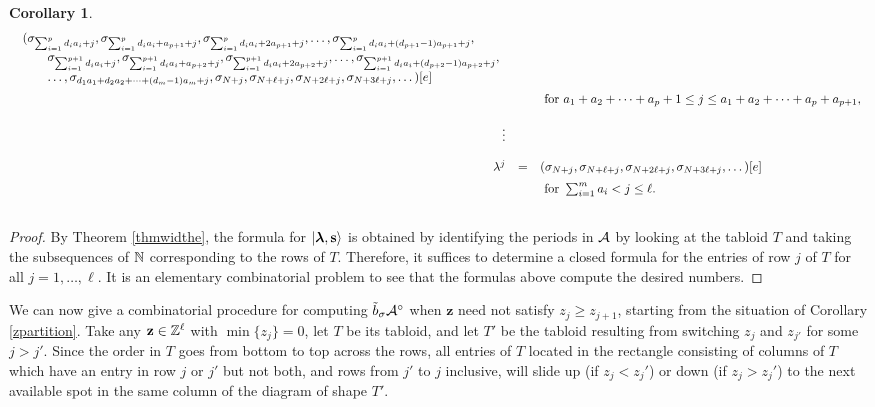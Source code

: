 \documentclass[12pt]{amsart}
\numberwithin{equation}{section}
\theoremstyle{definition}
\newtheorem{corollary}[equation]{Corollary}
\newcommand{\mbz}{\mathbf{z}}
\begin{document}
\begin{corollary}
$$\begin{array}{rcll}
\begin{array}[t]{l}
(\sigma_{\sum_{i=1}^p d_ia_i+j},\sigma_{\sum_{i=1}^p d_ia_i+a_{p+1}+j},\sigma_{\sum_{i=1}^p d_ia_i+2a_{p+1}+j},\dots,\sigma_{\sum_{i=1}^p d_ia_i+(d_{p+1}-1)a_{p+1}+j}, \\
\quad\quad \sigma_{\sum_{i=1}^{p+1} d_ia_i+j},\sigma_{\sum_{i=1}^{p+1} d_ia_i+a_{p+2}+j},\sigma_{\sum_{i=1}^{p+1} d_ia_i+2a_{p+2}+j},\dots,\sigma_{\sum_{i=1}^{p+1} d_ia_i+(d_{p+2}-1)a_{p+2}+j},\\
\quad\quad\dots,\sigma_{d_1a_1+d_2a_2+\dots+(d_m-1)a_m+j},\sigma_{N+j},\sigma_{N+\ell+j},\sigma_{N+2\ell+j},\sigma_{N+3\ell+j},\dots)[e]
\end{array}\vspace{2mm}
\\
&&\text{ for } a_1+a_2+\dots+a_p+1\leq j \leq a_1+a_2+\dots+a_p+a_{p+1},
\\ \\
\vdots
\\ \\
\la^j & 
= & 
(\sigma_{N+j},\sigma_{N+\ell+j},\sigma_{N+2\ell+j},\sigma_{N+3\ell+j},\dots)[e]
\vspace{2mm}
\\
&&\text{ for } \sum_{i=1}^m a_i<j\leq \ell.
\\ \\
\end{array}
$$

\end{corollary}

\begin{proof} 

By Theorem \ref{thmwidthe},
the formula for $|\boldsymbol{\lambda},\mathbf{s}\rangle$ is obtained by identifying the periods in $\mathcal{A}$ by looking at the tabloid $T$
and taking the subsequences of $\mathbb{N}$ corresponding to the rows of $T$.
Therefore, it suffices to determine a closed formula for the entries of row $j$ of $T$ for all $j=1,\dots,\ell$.
It is an elementary combinatorial problem to see that the formulas above compute the desired numbers.
\end{proof}

We can now give a combinatorial procedure for computing ${\tilde{b}}_\sigma\mathcal{A}^\circ$ when $\mbz$ need not satisfy $z_j\geq z_{j+1}$, starting from the situation of Corollary \ref{zpartition}.
Take any $\mbz\in\Z^\ell$ with $\min\{z_j\}=0$, let $T$ be its tabloid, and let $T'$ be the tabloid resulting from switching $z_j$ and $z_{j'}$ for some $j> j'$. Since the order in $T$ goes from bottom to top across the rows, all entries of $T$ located in the rectangle consisting of columns of $T$ which have an entry in row $j$ or $j'$ but not both, and rows from $j'$ to $j$ inclusive, will slide up (if $z_j<z_j'$) or down (if $z_j>z_j'$) to the next available spot in the same column of the diagram of shape $T'$.
\end{document}
